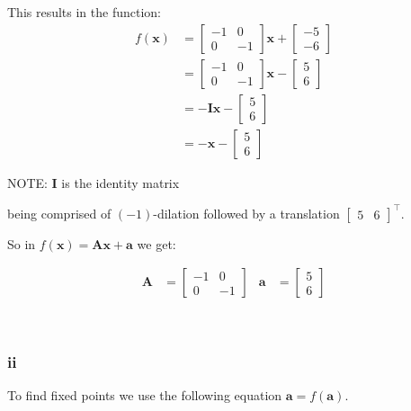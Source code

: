 \documentclass{article}
\newcommand{\blankpage}{
    \newpage
    \
    \newpage
}
\begin{document}
This results in the function:
\begin{align*}
    f(\mathbf x) &= \begin{bmatrix}
        -1 & 0 \\ 0 & -1
        \end{bmatrix}\mathbf x + \begin{bmatrix} -5 \\ -6\end{bmatrix} \\
    &= \begin{bmatrix}
        -1 & 0 \\ 0 & -1
        \end{bmatrix}\mathbf x - \begin{bmatrix} 5 \\ 6\end{bmatrix} \\
   &= -\mathbf {Ix} - \begin{bmatrix} 5 \\ 6\end{bmatrix} \\
   &= -\mathbf x - \begin{bmatrix} 5 \\ 6\end{bmatrix}
\end{align*}
\begin{center} NOTE: $\mathbf I$ is the identity matrix \end{center}

being comprised of $(-1)$-dilation followed by a translation $\begin{bmatrix} 5 & 6\end{bmatrix}^\top$.

So in $f(\mathbf x) = \mathbf{Ax + a}$ we get:

\begin{align*}
    \mathbf A &= \begin{bmatrix} -1 & 0 \\ 0 &-1 \end{bmatrix} &
    \mathbf a &= \begin{bmatrix} 5 \\ 6\end{bmatrix}
\end{align*}

\blankpage
\subsubsection{ii}

To find fixed points we use the following equation $\mathbf a = f(\mathbf a)$.
\end{document}

